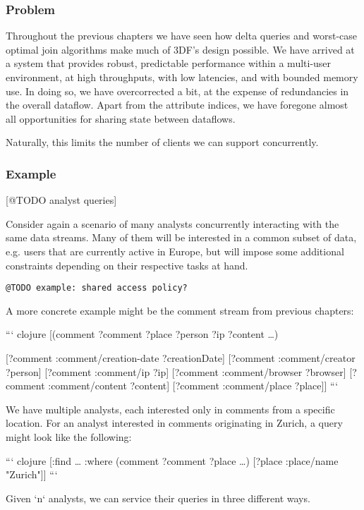 \documentclass[../catalog.tex]{subfiles}
\begin{document}
\subsubsection{Problem}

Throughout the previous chapters we have seen how delta queries and
worst-case optimal join algorithms make much of 3DF's design
possible. We have arrived at a system that provides robust,
predictable performance within a multi-user environment, at high
throughputs, with low latencies, and with bounded memory use. In doing
so, we have overcorrected a bit, at the expense of redundancies in the
overall dataflow. Apart from the attribute indices, we have foregone
almost all opportunities for sharing state between dataflows.

Naturally, this limits the number of clients we can support
concurrently.

\subsubsection{Example}

[@TODO analyst queries]

Consider again a scenario of many analysts concurrently interacting
with the same data streams. Many of them will be interested in a
common subset of data, e.g. users that are currently active in Europe,
but will impose some additional constraints depending on their
respective tasks at hand.

\texttt{@TODO example: shared access policy?}

A more concrete example might be the comment stream from previous
chapters:

``` clojure
[(comment ?comment ?place ?person ?ip ?content \ldots{})

 [?comment :comment/creation-date ?creationDate]
 [?comment :comment/creator ?person]
 [?comment :comment/ip ?ip]
 [?comment :comment/browser ?browser]
 [?comment :comment/content ?content]
 [?comment :comment/place ?place]]
```

We have multiple analysts, each interested only in comments from a
specific location. For an analyst interested in comments originating
in Zurich, a query might look like the following:

``` clojure
[:find \ldots{}
 :where
 (comment ?comment ?place \ldots{})
 [?place :place/name "Zurich"]]
```

Given `n` analysts, we can service their queries in three different
ways.
\end{document}
